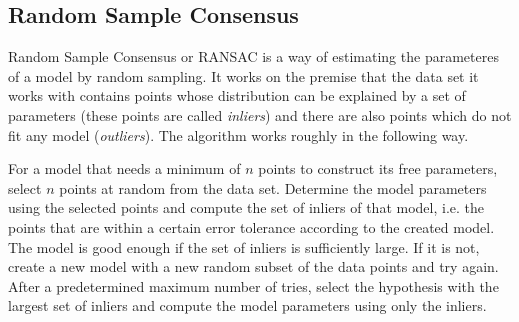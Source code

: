 \subsection{Random Sample Consensus}

Random Sample Consensus or RANSAC \cite{fischler1981random} is a way of estimating the parameteres of a model by random sampling. It works on the premise that the data set it works with contains points whose distribution can be explained by a set of parameters (these points are called \emph{inliers}) and there are also points which do not fit any model (\emph{outliers}). The algorithm works roughly in the following way.

For a model that needs a minimum of $n$ points to construct its free parameters, select $n$ points at random from the data set. Determine the model parameters using the selected points and compute the set of inliers of that model, i.e. the points that are within a certain error tolerance according to the created model. The model is good enough if the set of inliers is sufficiently large. If it is not, create a new model with a new random subset of the data points and try again. After a predetermined maximum number of tries, select the hypothesis with the largest set of inliers and compute the model parameters using only the inliers.

